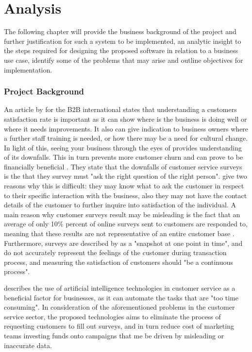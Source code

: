 \chapter{Analysis }

The following chapter will provide the business background of the project and further justification for such a system to be implemented, an analytic insight to the steps required for designing the proposed software in relation to a business use case, identify some of the problems that may arise and outline objectives for implementation.

\subsection*{Project Background}
An article by \citeauthor{hague} for the B2B international states that understanding a customers satisfaction rate is important as it can show where is the business is doing well or where it needs improvements. It also can give indication to business owners where a further staff training is needed, or how there may be a need for cultural change. In light of this, seeing your business through the eyes of provides understanding of its downfalls. This in turn prevents more customer churn and can prove to be financially beneficial \citep{hague}. They state that the downfalls of customer service surveys is the that they survey must "ask the right question of the right person". \citeauthor{hague} give two reasons why this is difficult: they may know what to ask the customer in respect to their specific interaction with the business, also they may not have the contact details of the customer to further inquire into satisfaction of the individual. A main reason why customer surveys result may be misleading is the fact that an average of only 10\% percent of online surveys sent to customers are responded to, meaning that these results are not representative of an entire customer base \citep{willott} . Furthermore, surveys are described by \citeauthor{hague} as a "snapshot at one point in time", and do not accurately represent the feelings of the customer during transaction process, and measuring the satisfaction of customers should "be a continuous process".


\citeauthor{keith} describes the use of artificial intelligence technologies in customer service as a beneficial factor for businesses, as it can automate the tasks that are "too time consuming".
In consideration of the aforementioned problems in the customer service sector, the proposed technologies aims to eliminate the process of requesting customers to fill out surveys, and in turn reduce cost of marketing teams investing funds onto campaigns that me be driven by misleading or inaccurate data.

